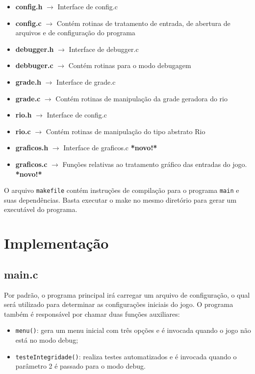 \documentclass[11pt,a4paper]{article}
\begin{document}
\begin{itemize}
\item \textbf{config.h} $\rightarrow$ Interface de config.c
\item \textbf{config.c} $\rightarrow$ Contém rotinas de tratamento de entrada, de abertura de arquivos e de configuração do programa
\item \textbf{debugger.h} $\rightarrow$ Interface de debugger.c
\item \textbf{debbuger.c} $\rightarrow$ Contém rotinas para o modo debugagem
\item \textbf{grade.h} $\rightarrow$ Interface de grade.c
\item \textbf{grade.c} $\rightarrow$ Contém rotinas de manipulação da grade geradora do rio
\item \textbf{rio.h} $\rightarrow$ Interface de config.c
\item \textbf{rio.c} $\rightarrow$ Contém rotinas de manipulação do tipo abstrato Rio
\item \textbf{graficos.h} $\rightarrow$ Interface de graficos.c \textbf{*novo!*}
\item \textbf{graficos.c} $\rightarrow$ Funções relativas ao tratamento gráfico das entradas do jogo. \textbf{*novo!*}
\end{itemize}

O arquivo \verb|makefile| contém instruções de compilação para o programa \verb|main| e suas dependências. Basta executar o make no mesmo diretório para gerar um executável do programa.

\section{Implementação}
\subsection{main.c}
Por padrão, o programa principal irá carregar um arquivo de configuração, o qual será utilizado para determinar as configurações iniciais do jogo. O programa também é responsável por chamar duas funções auxiliares:

\begin{itemize}
\item \verb|menu()|: gera um menu inicial com três opções e é invocada quando o jogo não está no modo debug;
\item \verb|testeIntegridade()|: realiza testes automatizados e é invocada quando o parâmetro 2 é passado para o modo debug. 
\end{itemize}
\newpage
\end{document}
